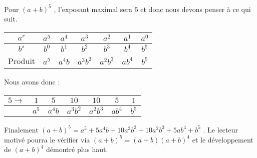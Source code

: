 \medskip
Pour $(a + b)^5$ , l'exposant maximal sera $5$ et donc nous devons penser à ce qui suit.

\medskip
\begin{center}
\begin{tabular}{c*{6}{|c}}
	$a^r$
		& $a^5$  &  $a^4$    &  $a^3$      &  $a^2$      &  $a^1$    &  $a^0$
	\\ \hline
	$b^s$ 
		& $b^0$  &  $b^1$    &  $b^2$      &  $b^3$      &  $b^4$    &  $b^5$
	\\ \hline
	Produit 
		& $a^5$  &  $a^4 b$  &  $a^3 b^2$  &  $a^2 b^3$  &  $a b^4$  &  $b^5$
\end{tabular}
\end{center}

\medskip
Nous avons donc :

\medskip
\begin{center}
\begin{tabular}{|l*{6}{|c}|}
	\hline
	$5 \rightarrow$
		& $1$    &  $5$      &  $10$       &  $10$       &  $5$      &  $1$
	\\ \hline
		& $a^5$  &  $a^4 b$  &  $a^3 b^2$  &  $a^2 b^3$  &  $a b^4$  &  $b^5$
	\\ \hline
\end{tabular}
\end{center}

\medskip
Finalement $(a + b)^5 = a^5 + 5 a^4 b + 10 a^3 b^2 + 10 a^2 b^3 + 5 a b^4 + b^5$ . Le lecteur motivé pourra le vérifier via $(a + b)^5 = (a + b) (a + b)^4$ et le développement de $(a + b)^4$ démontré plus haut.


